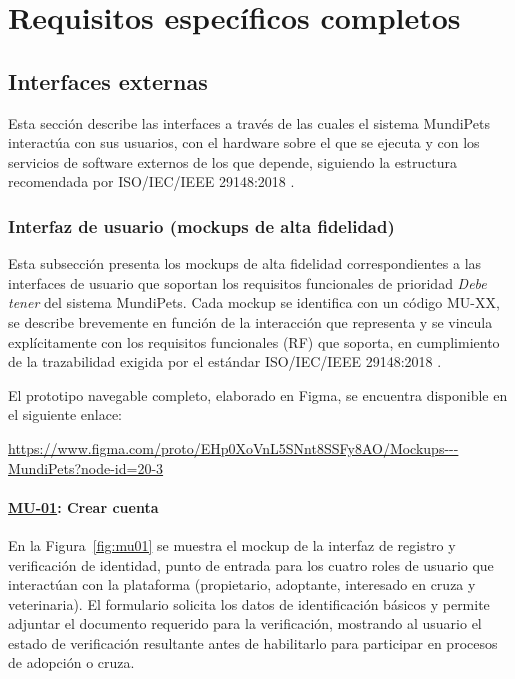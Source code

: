 \documentclass[journal,onecolumn]{IEEEtran}
\begin{document}
	\section{Requisitos específicos completos}
	\label{sec:requisitos}
	
	\subsection{Interfaces externas}
	\label{sec:interfaces}
	
	Esta sección describe las interfaces a través de las cuales el sistema
	MundiPets interactúa con sus usuarios, con el hardware sobre el que se
	ejecuta y con los servicios de software externos de los que depende,
	siguiendo la estructura recomendada por ISO/IEC/IEEE 29148:2018
	\cite{iso29148}.
	
	\subsubsection{Interfaz de usuario (mockups de alta fidelidad)}
	\label{sec:mockups}
	
	Esta subsección presenta los mockups de alta fidelidad correspondientes a
	las interfaces de usuario que soportan los requisitos funcionales de
	prioridad \emph{Debe tener} del sistema MundiPets. Cada mockup se identifica
	con un código MU-XX, se describe brevemente en función de la interacción que
	representa y se vincula explícitamente con los requisitos funcionales (RF)
	que soporta, en cumplimiento de la trazabilidad exigida por el estándar
	ISO/IEC/IEEE 29148:2018 \cite{iso29148}.
	
	El prototipo navegable completo, elaborado en Figma, se encuentra disponible
	en el siguiente enlace:
	
	\begin{center}
		\small\url{https://www.figma.com/proto/EHp0XoVnL5SNnt8SSFy8AO/Mockups---MundiPets?node-id=20-3}
	\end{center}
	
	\paragraph{\hyperref[fig:mu01]{MU-01}: Crear cuenta}
	
	En la Figura~\ref{fig:mu01} se muestra el mockup de la interfaz de registro y
	verificación de identidad, punto de entrada para los cuatro roles de usuario
	que interactúan con la plataforma (propietario, adoptante, interesado en
	cruza y veterinaria). El formulario solicita los datos de identificación
	básicos y permite adjuntar el documento requerido para la verificación,
	mostrando al usuario el estado de verificación resultante antes de
	habilitarlo para participar en procesos de adopción o cruza.
	
\end{document}
